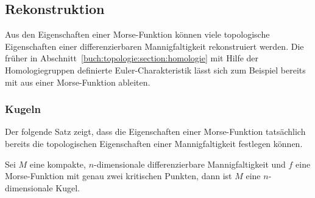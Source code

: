 %
%
%

%
%
\subsection{Rekonstruktion}
Aus den Eigenschaften einer Morse-Funktion können viele topologische
Eigenschaften einer differenzierbaren Mannigfaltigkeit rekonstruiert
werden.
Die früher in Abschnitt~\ref{buch:topologie:section:homologie}
mit Hilfe der Homologiegruppen definierte Euler-Charakteristik
lässt sich zum Beispiel bereits mit aus einer Morse-Funktion
ableiten.

%
%
\subsubsection{Kugeln}
Der folgende Satz zeigt, dass die Eigenschaften einer Morse-Funktion
tatsächlich bereits die topologischen Eigenschaften einer Mannigfaltigkeit
festlegen können.

\begin{satz}
\label{buch:topologie:morse:satz:kugeln}
Sei $M$ eine kompakte, $n$-dimensionale differenzierbare Mannigfaltigkeit
und $f$ eine Morse-Funktion mit genau zwei kritischen Punkten, dann ist
$M$ eine $n$-dimensionale Kugel.
\end{satz}

